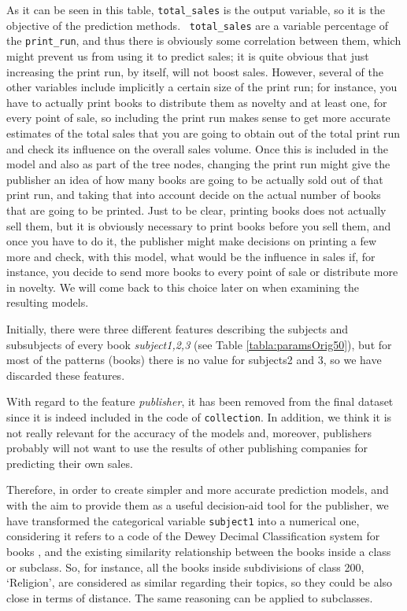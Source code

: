 \documentclass[a4paper,10pt,twocolumn,preprint,3p]{elsarticle}
\begin{document}
As it can be seen in this table, \texttt{total\_sales} is the output
variable, so it is the objective of the prediction methods. {\tt
  total\_sales} are a variable percentage of the {\tt print\_run}, and
thus there is obviously some correlation between them, which might
prevent us from using it to predict sales; it is quite obvious that
just increasing the print run, by itself, will not boost
sales. However, several of the other variables include implicitly a
certain size of the print run; for instance, you have to actually
print books to distribute them as novelty and at least one, for every
point of sale, so including the print run makes sense to get more
accurate estimates of the total sales that you are going to obtain out
of the total print run and check its influence on the overall sales
volume. Once this is included in the model and also as part of the
tree nodes, changing the print run might give the publisher an idea of
how many books are going to be actually sold out of that print run,
and taking that into account decide on the actual number of books that
are going to be printed. Just to be clear, printing books does not
actually sell them, but it is obviously necessary to print books
before you sell them, and once you have to do it, the publisher might
make decisions on printing a few more and check, with this model, what
would be the influence in sales if, for instance, you decide to send
more books to every point of sale or distribute more in novelty. We
will come back to this choice later on when examining the resulting
models. 

Initially, there were three different features describing the subjects
and subsubjects of every book \textit{subject1,2,3} (see Table
\ref{tabla:paramsOrig50}), but for most of the patterns (books) there
is no value for subjects2 and 3, so we have discarded these features.   

With regard to the feature \textit{publisher}, it has been removed from the final dataset since it is indeed included in the code of \texttt{collection}. In addition, we think it is not really relevant for the accuracy of the models and, moreover, publishers probably will not want to use the results of other publishing companies for predicting their own sales.

Therefore, in order to create simpler and more accurate prediction
models, and with the aim to provide them as a useful decision-aid tool
for the publisher, we have transformed the categorical variable
\texttt{subject1} into a numerical one, considering it refers to a
code of the Dewey Decimal Classification system for books
\cite{wiki:dewey}, and the existing similarity relationship between
the books inside a class or subclass. So, for instance, all the books
inside subdivisions of class 200, `Religion', are considered as
similar regarding their topics, so they could be also close in terms
of distance. The same reasoning can be applied to subclasses. 
\end{document}
